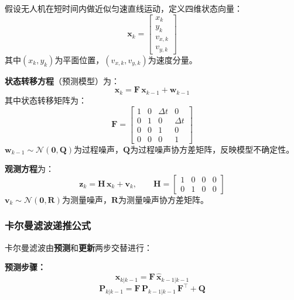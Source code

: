 \documentclass[12pt, a4paper]{article}
\begin{document}
假设无人机在短时间内做近似匀速直线运动，定义四维状态向量：
\begin{equation}
  \bm{x}_k = \begin{bmatrix} x_k \\ y_k \\ v_{x,k} \\ v_{y,k} \end{bmatrix}
  \label{eq:state_vector}
\end{equation}
其中$(x_k, y_k)$为平面位置，$(v_{x,k}, v_{y,k})$为速度分量。

\textbf{状态转移方程}（预测模型）为：
\begin{equation}
  \bm{x}_k = \bm{F}\,\bm{x}_{k-1} + \bm{w}_{k-1}
  \label{eq:state_transition}
\end{equation}
其中状态转移矩阵为：
\begin{equation}
  \bm{F} = \begin{bmatrix}
    1 & 0 & \Delta t & 0 \\
    0 & 1 & 0 & \Delta t \\
    0 & 0 & 1 & 0 \\
    0 & 0 & 0 & 1
  \end{bmatrix}
  \label{eq:F_matrix}
\end{equation}
$\bm{w}_{k-1} \sim \mathcal{N}(\bm{0}, \bm{Q})$为过程噪声，$\bm{Q}$为过程噪声协方差矩阵，反映模型不确定性。

\textbf{观测方程}为：
\begin{equation}
  \bm{z}_k = \bm{H}\,\bm{x}_k + \bm{v}_k,\qquad
  \bm{H} = \begin{bmatrix} 1 & 0 & 0 & 0 \\ 0 & 1 & 0 & 0 \end{bmatrix}
  \label{eq:observation}
\end{equation}
$\bm{v}_k \sim \mathcal{N}(\bm{0}, \bm{R})$为测量噪声，$\bm{R}$为测量噪声协方差矩阵。

\subsubsection{卡尔曼滤波递推公式}

卡尔曼滤波由\textbf{预测}和\textbf{更新}两步交替进行：

\textbf{预测步骤：}
\begin{equation}
  \hat{\bm{x}}_{k|k-1} = \bm{F}\,\hat{\bm{x}}_{k-1|k-1}
  \label{eq:kf_predict_state}
\end{equation}
\begin{equation}
  \bm{P}_{k|k-1} = \bm{F}\,\bm{P}_{k-1|k-1}\,\bm{F}^\top + \bm{Q}
  \label{eq:kf_predict_cov}
\end{equation}
\end{document}
